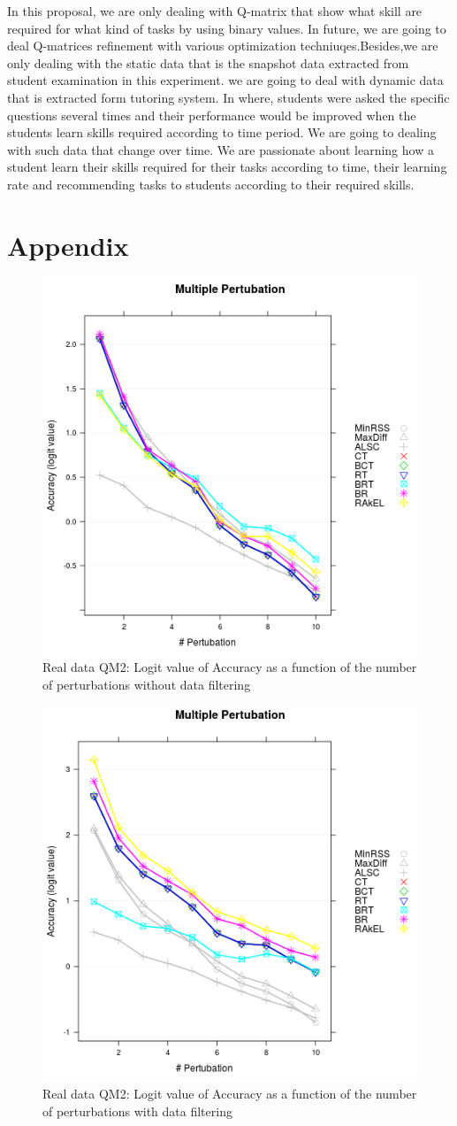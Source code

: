 \documentclass[12pt]{article}
\begin{document}
In this proposal, we are only dealing with Q-matrix that show what skill are required for what kind of tasks by using binary values. In future, we are going to deal Q-matrices refinement with various optimization techniuqes.Besides,we are only dealing with the static data that is the snapshot data extracted from student examination in this experiment. we are going to deal with dynamic data that is extracted form tutoring system. In where, students were asked the specific questions several times and their performance would be improved when the students learn skills required according to time period. We are going to dealing with such data that change over time. We are passionate about learning how a student learn their skills required for their tasks according to time, their learning rate and recommending tasks to students according to their required skills.  

\section{Appendix}

\begin{figure}[h]
  \centering
    \includegraphics[width=75 mm ,scale=0.27]{graph/old-SA.png}
  \caption{Real data QM2: Logit value of Accuracy as a function of the number of perturbations without data filtering}\label{fig:oldSAforReal}
\end{figure}

\begin{figure}[h]
  \centering
    \includegraphics[width=75 mm ,scale=0.27]{graph/m3-SA.png}
  \caption{Real data QM2: Logit value of Accuracy as a function of the number of perturbations with data filtering}\label{fig:m3SAforReal}
\end{figure}


\pagebreak



\end{document}
